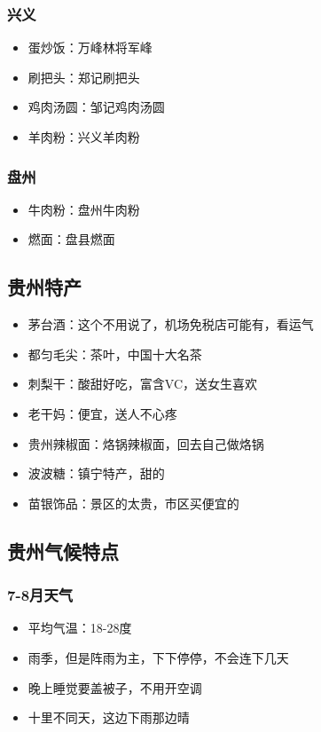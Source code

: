 \documentclass[12pt,a4paper,UTF8]{ctexart}
\begin{document}
\subsubsection{兴义}
\begin{itemize}
\item 蛋炒饭：万峰林将军峰
\item 刷把头：郑记刷把头
\item 鸡肉汤圆：邹记鸡肉汤圆
\item 羊肉粉：兴义羊肉粉
\end{itemize}

\subsubsection{盘州}
\begin{itemize}
\item 牛肉粉：盘州牛肉粉
\item 燃面：盘县燃面
\end{itemize}

\subsection{贵州特产}
\begin{itemize}
\item 茅台酒：这个不用说了，机场免税店可能有，看运气
\item 都匀毛尖：茶叶，中国十大名茶
\item 刺梨干：酸甜好吃，富含VC，送女生喜欢
\item 老干妈：便宜，送人不心疼
\item 贵州辣椒面：烙锅辣椒面，回去自己做烙锅
\item 波波糖：镇宁特产，甜的
\item 苗银饰品：景区的太贵，市区买便宜的
\end{itemize}

\subsection{贵州气候特点}

\subsubsection{7-8月天气}
\begin{itemize}
\item 平均气温：18-28度
\item 雨季，但是阵雨为主，下下停停，不会连下几天
\item 晚上睡觉要盖被子，不用开空调
\item 十里不同天，这边下雨那边晴
\end{itemize}
\end{document}
